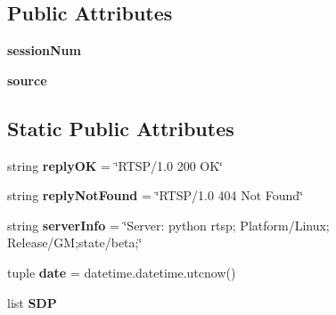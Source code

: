 \subsection*{Public Attributes}
\begin{DoxyCompactItemize}
\item 
\hypertarget{classpython_1_1streamserver_1_1server_1_1rtspHandler_1_1RTSPRequestHandler_aebbdf12429f04728ce841d8f7fa462d3}{
{\bfseries sessionNum}}
\label{classpython_1_1streamserver_1_1server_1_1rtspHandler_1_1RTSPRequestHandler_aebbdf12429f04728ce841d8f7fa462d3}

\item 
\hypertarget{classpython_1_1streamserver_1_1server_1_1rtspHandler_1_1RTSPRequestHandler_afb21e7af61aeae2f18971405b838aa05}{
{\bfseries source}}
\label{classpython_1_1streamserver_1_1server_1_1rtspHandler_1_1RTSPRequestHandler_afb21e7af61aeae2f18971405b838aa05}

\end{DoxyCompactItemize}
\subsection*{Static Public Attributes}
\begin{DoxyCompactItemize}
\item 
\hypertarget{classpython_1_1streamserver_1_1server_1_1rtspHandler_1_1RTSPRequestHandler_ac8627b1dee60f625fe3cbf288775de9c}{
string {\bfseries replyOK} = \char`\"{}RTSP/1.0 200 OK\char`\"{}}
\label{classpython_1_1streamserver_1_1server_1_1rtspHandler_1_1RTSPRequestHandler_ac8627b1dee60f625fe3cbf288775de9c}

\item 
\hypertarget{classpython_1_1streamserver_1_1server_1_1rtspHandler_1_1RTSPRequestHandler_a695b57b1f4112027397ff306cf99dbef}{
string {\bfseries replyNotFound} = \char`\"{}RTSP/1.0 404 Not Found\char`\"{}}
\label{classpython_1_1streamserver_1_1server_1_1rtspHandler_1_1RTSPRequestHandler_a695b57b1f4112027397ff306cf99dbef}

\item 
\hypertarget{classpython_1_1streamserver_1_1server_1_1rtspHandler_1_1RTSPRequestHandler_a6915ddd8be3f359414edf400701ee38e}{
string {\bfseries serverInfo} = \char`\"{}Server: python rtsp; Platform/Linux; Release/GM;state/beta;\char`\"{}}
\label{classpython_1_1streamserver_1_1server_1_1rtspHandler_1_1RTSPRequestHandler_a6915ddd8be3f359414edf400701ee38e}

\item 
\hypertarget{classpython_1_1streamserver_1_1server_1_1rtspHandler_1_1RTSPRequestHandler_abb9a9e503dbabe873ea0eab9a1dc6af1}{
tuple {\bfseries date} = datetime.datetime.utcnow()}
\label{classpython_1_1streamserver_1_1server_1_1rtspHandler_1_1RTSPRequestHandler_abb9a9e503dbabe873ea0eab9a1dc6af1}

\item 
list {\bfseries SDP}
\end{DoxyCompactItemize}


